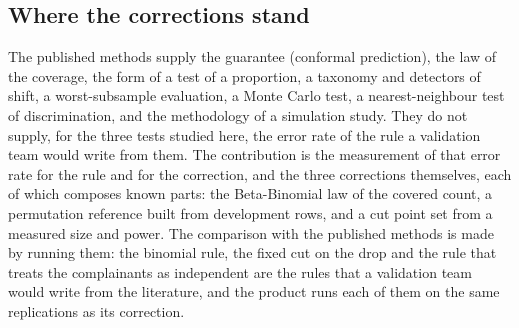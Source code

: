 \subsection{Where the corrections stand}

The published methods supply the guarantee (conformal prediction), the law of the coverage, the form of a test of a proportion, a taxonomy and detectors of shift, a worst-subsample evaluation, a Monte Carlo test, a nearest-neighbour test of discrimination, and the methodology of a simulation study. They do not supply, for the three tests studied here, the error rate of the rule a validation team would write from them. The contribution is the measurement of that error rate for the rule and for the correction, and the three corrections themselves, each of which composes known parts: the Beta-Binomial law of the covered count, a permutation reference built from development rows, and a cut point set from a measured size and power. The comparison with the published methods is made by running them: the binomial rule, the fixed cut on the drop and the rule that treats the complainants as independent are the rules that a validation team would write from the literature, and the product runs each of them on the same replications as its correction.
